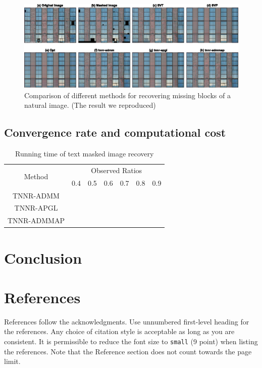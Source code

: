 \documentclass{article}
\begin{document}
{\begin{figure}[ht]
	\centering
	\includegraphics[]{./assets/fig9.eps}
	\caption{Comparison of different methods for recovering missing blocks of
		a natural image. (The result we reproduced)}
	\label{fig9}
\end{figure}

\subsection{Convergence rate and computational cost}


\begin{table}
	\caption{Running time of text masked image recovery}
	\label{rcost}
	\centering
	\begin{tabular}{ccccccc}
		\toprule
		\multirow{2}{*}{Method} & \multicolumn{6}{c}{Observed Ratios} \\
		\cmidrule(r){2-7} 
		& 0.4 & 0.5 & 0.6 & 0.7 & 0.8  & 0.9 \\
		\midrule
		TNNR-ADMM &   &  & & & &   \\
		TNNR-APGL & & & & & &  \\
		TNNR-ADMMAP & & & & & &   \\
		\bottomrule
	\end{tabular}
\end{table}


\section{Conclusion}
\label{s5}




\section*{References}


References follow the acknowledgments. Use unnumbered first-level heading for
the references. Any choice of citation style is acceptable as long as you are
consistent. It is permissible to reduce the font size to \verb+small+ (9 point)
when listing the references.
Note that the Reference section does not count towards the page limit.
\medskip


}
\end{document}
